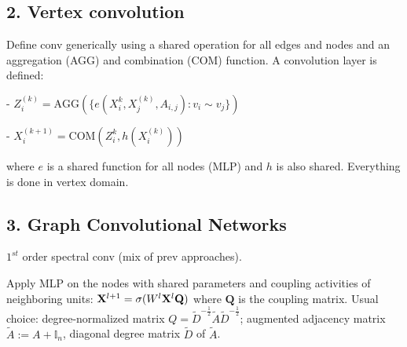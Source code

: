 \subsection*{2. Vertex convolution}
Define conv generically using a shared operation for all edges and nodes and an aggregation (AGG) and combination (COM) function. A convolution layer is defined:

- $Z_i^{(k)} = \text{AGG}(\{e(X_i^{k}, X_j^{(k)}, A_{i,j}): v_i \sim v_j\})$

- $X_i^{(k+1)} = \text{COM}(Z_i^{k}, h(X_i^{(k)}))$

where $e$ is a shared function for all nodes (MLP) and $h$ is also shared. Everything is done in vertex domain.

\subsection*{3. Graph Convolutional Networks}
$1^{st}$ order spectral conv (mix of prev approaches). 

Apply MLP on the nodes with shared parameters and coupling activities of neighboring units: $\mathbf{X}^{l+1} = \sigma(W^l\mathbf{X}^l\mathbf Q)$ where $\mathbf Q$ is the coupling matrix. Usual choice: degree-normalized matrix $Q=\tilde D^{-\frac 1 2}\tilde A\tilde D^{-\frac 1 2}$; augmented adjacency matrix $\tilde A := A + \mathbb{I}_n$, diagonal degree matrix $\tilde D$ of $\tilde A$.